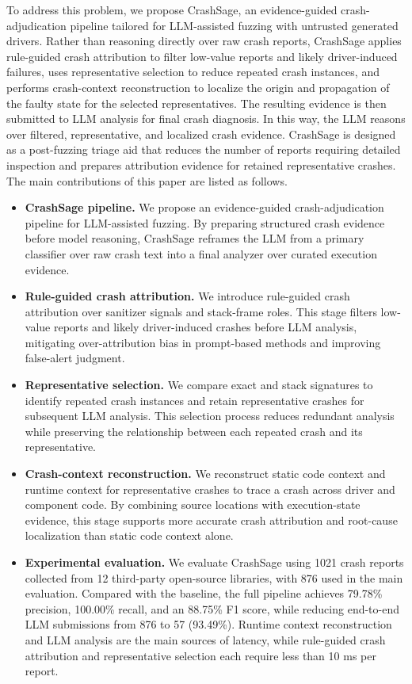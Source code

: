 \documentclass[pdflatex,sn-basic]{sn-jnl}%
\theoremstyle{thmstyleone}%
\theoremstyle{thmstyletwo}%
\theoremstyle{thmstylethree}%
\begin{document}
To address this problem, we propose CrashSage, an evidence-guided crash-adjudication pipeline tailored for LLM-assisted fuzzing with untrusted generated drivers. Rather than reasoning directly over raw crash reports, CrashSage applies rule-guided crash attribution to filter low-value reports and likely driver-induced failures, uses representative selection to reduce repeated crash instances, and performs crash-context reconstruction to localize the origin and propagation of the faulty state for the selected representatives. The resulting evidence is then submitted to LLM analysis for final crash diagnosis. In this way, the LLM reasons over filtered, representative, and localized crash evidence. CrashSage is designed as a post-fuzzing triage aid that reduces the number of reports requiring detailed inspection and prepares attribution evidence for retained representative crashes. The main contributions of this paper are listed as follows.

\begin{itemize}
    \item \textbf{CrashSage pipeline.} We propose an evidence-guided crash-adjudication pipeline for LLM-assisted fuzzing. By preparing structured crash evidence before model reasoning, CrashSage reframes the LLM from a primary classifier over raw crash text into a final analyzer over curated execution evidence.
    \item \textbf{Rule-guided crash attribution.} We introduce rule-guided crash attribution over sanitizer signals and stack-frame roles. This stage filters low-value reports and likely driver-induced crashes before LLM analysis, mitigating over-attribution bias in prompt-based methods and improving false-alert judgment.
    \item \textbf{Representative selection.} We compare exact and stack signatures to identify repeated crash instances and retain representative crashes for subsequent LLM analysis. This selection process reduces redundant analysis while preserving the relationship between each repeated crash and its representative.
    \item \textbf{Crash-context reconstruction.} We reconstruct static code context and runtime context for representative crashes to trace a crash across driver and component code. By combining source locations with execution-state evidence, this stage supports more accurate crash attribution and root-cause localization than static code context alone.
    \item \textbf{Experimental evaluation.} We evaluate CrashSage using 1021 crash reports collected from 12 third-party open-source libraries, with 876 used in the main evaluation. Compared with the baseline, the full pipeline achieves 79.78\% precision, 100.00\% recall, and an 88.75\% F1 score, while reducing end-to-end LLM submissions from 876 to 57 (93.49\%). Runtime context reconstruction and LLM analysis are the main sources of latency, while rule-guided crash attribution and representative selection each require less than 10 ms per report.
\end{itemize}
\end{document}
